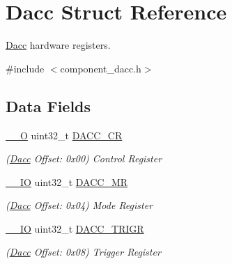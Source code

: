 \hypertarget{structDacc}{}\section{Dacc Struct Reference}
\label{structDacc}


\mbox{\hyperlink{structDacc}{Dacc}} hardware registers.  




{\ttfamily \#include $<$component\+\_\+dacc.\+h$>$}

\subsection*{Data Fields}
\begin{DoxyCompactItemize}
\item 
\mbox{\label{structDacc_a48b4e673b7ee90e09f94a9fce1ba2990}} 
\mbox{\hyperlink{core__cm7_8h_a7e25d9380f9ef903923964322e71f2f6}{\+\_\+\+\_\+O}} uint32\+\_\+t \mbox{\hyperlink{structDacc_a48b4e673b7ee90e09f94a9fce1ba2990}{D\+A\+C\+C\+\_\+\+CR}}
\begin{DoxyCompactList}\small\item\em (\mbox{\hyperlink{structDacc}{Dacc}} Offset\+: 0x00) Control Register \end{DoxyCompactList}\item 
\mbox{\label{structDacc_a45307b0cc8da9f0aaccf3d1f1a368ef3}} 
\mbox{\hyperlink{core__cm7_8h_aec43007d9998a0a0e01faede4133d6be}{\+\_\+\+\_\+\+IO}} uint32\+\_\+t \mbox{\hyperlink{structDacc_a45307b0cc8da9f0aaccf3d1f1a368ef3}{D\+A\+C\+C\+\_\+\+MR}}
\begin{DoxyCompactList}\small\item\em (\mbox{\hyperlink{structDacc}{Dacc}} Offset\+: 0x04) Mode Register \end{DoxyCompactList}\item 
\mbox{\label{structDacc_af6ab2c13dfd4acbe9a5a3808a6a7fd5e}} 
\mbox{\hyperlink{core__cm7_8h_aec43007d9998a0a0e01faede4133d6be}{\+\_\+\+\_\+\+IO}} uint32\+\_\+t \mbox{\hyperlink{structDacc_af6ab2c13dfd4acbe9a5a3808a6a7fd5e}{D\+A\+C\+C\+\_\+\+T\+R\+I\+GR}}
\begin{DoxyCompactList}\small\item\em (\mbox{\hyperlink{structDacc}{Dacc}} Offset\+: 0x08) Trigger Register \end{DoxyCompactList}\item 

\end{DoxyCompactItemize}
